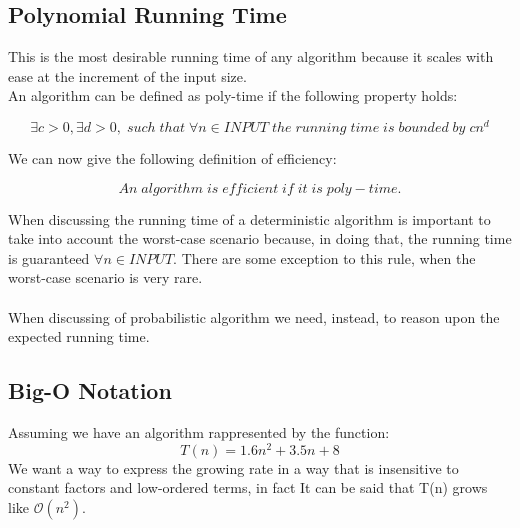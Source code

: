 \documentclass[11pt]{article}
\begin{document}
\subsection{Polynomial Running Time}
This is the most desirable running time of any algorithm because it scales with ease at the increment of the input size.\\An algorithm can be defined as poly-time if the following property holds:

\[ \exists c > 0, \exists d >0, \; such \; that \; \forall n \in INPUT \; the \; running \; time \; is \; bounded \; by\; cn^{d} \]

We can now give the following definition of efficiency:

\[ An \; algorithm \; is \; efficient \; if \; it \; is \; poly-time.\]

When discussing the running time of a deterministic algorithm is important to take into account the worst-case scenario because, in doing that, the running time is guaranteed $\forall n \in INPUT.$ There are some exception to this rule, when the worst-case scenario is very rare.\\\\
When discussing of probabilistic algorithm we need, instead, to reason upon the expected running time.

\subsection{Big-O Notation}

Assuming we have an algorithm rappresented by the function:
 \[ T(n) = 1.6n^{2} + 3.5n+8\]
 We want a way to express the growing rate in a way that is insensitive to constant factors and low-ordered terms, in fact It can be said that T(n) grows like $\mathcal{O}(n^{2})$.\\
\end{document}
